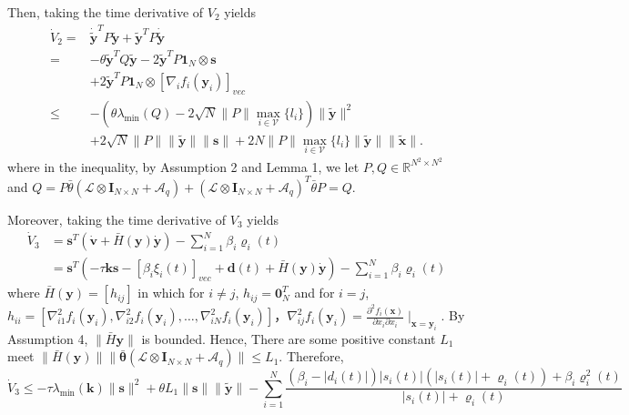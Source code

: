 \documentclass[12pt, a4paper, oneside]{ctexbook}
\begin{document}
Then, taking the time derivative of $V_2$ yields
\begin{equation}
    \begin{aligned}
        \dot{V}_{2}= & \dot{\tilde{\mathbf{y}}}^{T}P\tilde{\mathbf{y}}+\tilde{\mathbf{y}}^{T}P\dot{\tilde{\mathbf{y}}}                                         \\
        =            & -\theta\mathbf{\tilde{y}}^TQ\mathbf{\tilde{y}}-2\mathbf{\tilde{y}}^TP\mathbf{1}_N\otimes\mathbf{s}                                      \\
                     & +2\tilde{\mathbf{y}}^TP\mathbf{1}_N\otimes[\nabla_if_i(\mathbf{y}_i)]_{vec}                                                             \\
        \leq         & -(\theta\lambda_{\min}(Q)-2\sqrt{N}\|P\|\max_{i\in\mathcal{V}}\{l_{i}\})\|\tilde{\mathbf{y}}\|^{2}                                      \\
                     & +2\sqrt{N}\|P\|\|\tilde{\mathbf{y}}\|\|\mathbf{s}\|+2N\|P\|\max_{i\in\mathcal{V}}\{l_{i}\}\|\tilde{\mathbf{y}}\|\|\tilde{\mathbf{x}}\|.
    \end{aligned}
\end{equation}
where in the inequality, by Assumption 2 and Lemma 1, we let $P,Q\in\mathbb{R}^{N^{2}\times N^{2}}$ and $Q = P\bar{\theta}(\mathcal{L}\otimes\mathbf{I}_{N\times N}+\mathcal{A}_q)+(\mathcal{L}\otimes\mathbf{I}_{N\times N}+\mathcal{A}_q)^T\bar{\theta}P=Q$.

Moreover, taking the time derivative of $V_3$ yields
\begin{equation}
    \begin{aligned}
        \dot{V}_3 & ={\mathbf{s}}^T(\dot{\mathbf{v}}+\bar{H}(\mathbf{y})\dot{\mathbf{y}}) - \sum_{i = 1}^{N} \beta_i\varrho_i(t)                                                 \\
                  & ={\mathbf{s}}^T(-\tau\mathbf{k}\mathbf{s}-[\beta_i\xi_i(t)]_{vec}+\mathbf{d}(t) +\bar{H}(\mathbf{y})\dot{\mathbf{y}}) - \sum_{i = 1}^{N} \beta_i\varrho_i(t)
    \end{aligned}
\end{equation}
where $\bar{H}(\mathbf{y})=[h_{ij}]$ in which for $i \neq j$, $h_{ij} = \mathbf{0}_N^T$ and for $i = j$, $h_{ii}=[\nabla_{i1}^{2}f_{i}(\mathbf{y}_{i}),\nabla_{i2}^{2}f_{i}(\mathbf{y}_{i}),\ldots,\nabla_{iN}^{2}f_{i}(\mathbf{y}_{i})]$，$\nabla_{ij}^{2}f_{i}(\mathbf{y}_{i})=\frac{\partial^{2}f_{i}(\mathbf{x})}{\partial x_{i}\partial x_{i}}\mid_{\mathbf{x}=\mathbf{y}_{i}}$. By Assumption 4, $\|\bar{H}\mathbf{y}\|$ is bounded. Hence, There are some positive constant $L_1$ meet $\|\bar{H}(\mathbf{y})\|\|\bar{\boldsymbol{\theta}}(\mathcal{L}\otimes \mathbf{I}_{N\times N}+\mathcal{A}_{q})\|\leq L_{1}$. Therefore,
\begin{equation}
    \dot{V}_3\leq-\tau\lambda_{\min}(\mathbf{k})\|{\mathbf{s}}\|^2+\theta L_1\|{\mathbf{s}}\|\|\tilde{\mathbf{y}}\|-\sum_{i = 1}^{N}\frac{(\beta_i - |d_i(t)|)|s_i(t)|(|s_i(t)|+\varrho_i(t)) + \beta_i\varrho_i^2(t)}{|s_i(t)| + \varrho_i(t)}
\end{equation}
\end{document}
